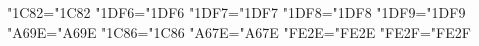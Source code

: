 \begingroup
\def\testengine#1#2!{\def\secondarg{#2}}
\testengine Τ!\relax
\ifx\secondarg\empty
    \lccode"1C82="1C82 %
    \lccode"1DF6="1DF6
    \lccode"1DF7="1DF7
    \lccode"1DF8="1DF8
    \lccode"1DF9="1DF9
    \lccode"A69E="A69E
    \lccode"1C86="1C86
    \lccode"A67E="A67E
    \lccode"FE2E="FE2E
    \lccode"FE2F="FE2F
    
\else
\fi
\endgroup
